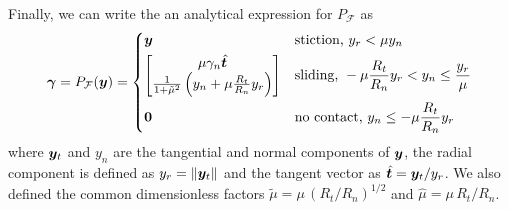 Finally, we can write the an analytical expression for $P_\mathcal{F}$ as
\begin{equation}
	\bgamma = P_\mathcal{F}(\vf{y}) = 
\begin{dcases}
	\vf{y} 
	& \text{stiction, } y_r < \mu y_n\\
	\begin{bmatrix}
		\mu\gamma_n\hat{\vf{t}}\\
		\frac{1}{1+\tilde\mu^2}\left(y_n +
	\mu\frac{R_t}{R_n}y_r\right)
	\end{bmatrix}
	& \text{sliding, } -\mu \frac{R_t}{R_n} y_r < y_n \leq \frac{y_r}{\mu}\\
    \vf{0} & \text{no contact, } y_n \leq -\mu \frac{R_t}{R_n} y_r
\end{dcases}	  
	\label{eq:inverse_dynamics_projection}
\end{equation}
where ${\bm{y}}_t$ and $y_n$ are the tangential and normal components of ${\bm{y}}$,
the radial component is defined as $y_r=\Vert{\bm{y}}_t\Vert$ and the tangent
vector as $\hat{{\bm{t}}}={\bm{y}}_t/y_r$. We also defined the common dimensionless
factors $\tilde\mu=\mu\,(R_t/R_n)^{1/2}$ and $\hat\mu=\mu\,R_t/R_n$.
